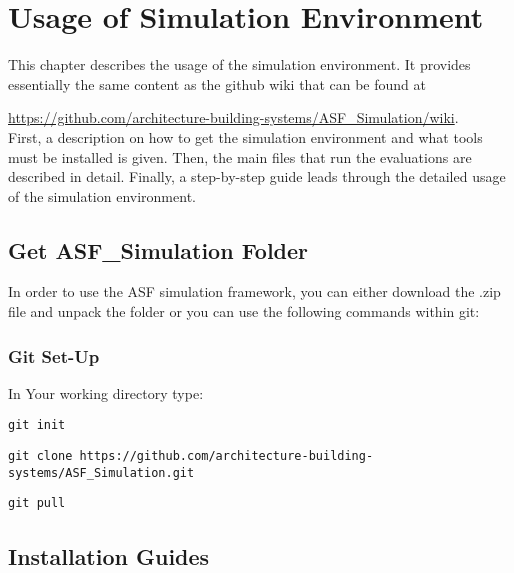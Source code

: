 
\chapter{Usage of Simulation Environment}\label{a:usage}

This chapter describes the usage of the simulation environment. It provides essentially the same content as the github wiki that can be found at 

\url{https://github.com/architecture-building-systems/ASF_Simulation/wiki}.\\

First, a description on how to get the simulation environment and what tools must be installed is given. Then, the main files that run the evaluations are described in detail. Finally, a step-by-step guide leads through the detailed usage of the simulation environment. 

\section{Get ASF\_Simulation Folder}
\label{s:getFolder}
	
	In order to use the ASF simulation framework, you can either download the .zip file and unpack the folder or you can use the following commands within git:

	\subsection{Git Set-Up}

	In Your working directory type:

	\begin{verbatim}git init\end{verbatim}


	\begin{verbatim}git clone https://github.com/architecture-building-systems/ASF_Simulation.git\end{verbatim}


	\begin{verbatim}git pull\end{verbatim}
	
		
\section{Installation Guides}
\label{s:installation}

